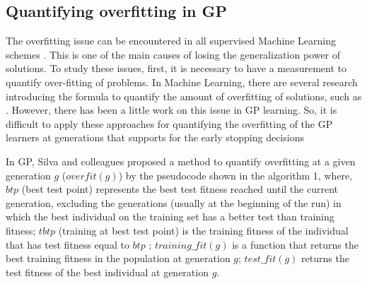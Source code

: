 \subsection {Quantifying overfitting in GP}
\label{Qua} 
The overfitting issue can be encountered in all supervised Machine Learning schemes \cite{1996Mitchell}. This is one of the main causes of losing the generalization power of solutions. To study these issues, first, it is necessary to have a measurement to quantify over-fitting of problems. In Machine Learning, there are several research introducing the formula to quantify the amount of overfitting of solutions, such as \cite{2008Trevor}\cite{Marcel}\cite{copas1983regression}\cite{bilger2015measuring}. However, there has been a little work on this issue in GP learning. So, it is difficult to apply these approaches for quantifying the overfitting of the GP learners at generations that supports for the early stopping decisions \par

In GP, Silva and colleagues \cite{2010Vanneschi} proposed  a method to quantify overfitting at a given generation $g$ ($overfit(g)$) by the pseudocode shown in the algorithm 1, where, $btp$ (best test point) represents the best test fitness reached until the current generation, excluding the generations (usually at the beginning of the run) in which the best individual on the training set has a better test than training fitness; $tbtp$ (training at best test point) is the training fitness of the individual that has test fitness equal to $btp$ ; $training\_fit(g)$ is a function that returns the best training fitness in the population at generation $g$; $test\_fit(g)$ returns the test fitness of the best individual at generation $g$.

